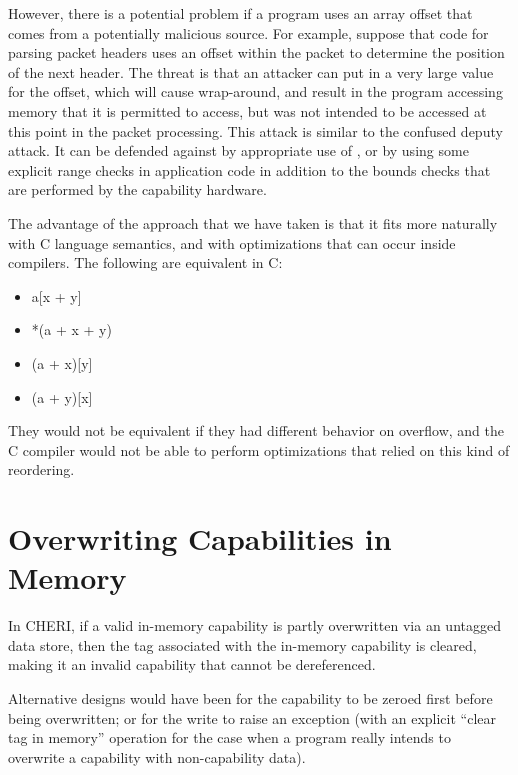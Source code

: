 However, there is a potential problem if a program uses an array offset that
comes from a potentially malicious source. For example, suppose that code for
parsing packet headers uses an offset within the packet to determine the
position of the next header. The threat is that an attacker can put in a
very large value for the offset, which will cause wrap-around, and result
in the program accessing memory that it is permitted to access, but was not
intended to be accessed at this point in the packet processing. This attack
is similar to the confused deputy attack. It can be defended against by
appropriate use of , or by using some explicit
range checks in application code in addition to the bounds checks that are
performed by the capability hardware.

The advantage of the approach that we have taken is that it fits more naturally
with C language semantics, and with optimizations that can occur inside compilers.
The following are equivalent in C:

\begin{itemize}
\item
a[x + y]
\item
*(a + x + y)
\item
(a + x)[y]
\item
(a + y)[x]
\end{itemize}

They would not be equivalent if they had different behavior on overflow, and
the C compiler would not be able to perform optimizations that relied on
this kind of reordering.

\section{Overwriting Capabilities in Memory}

In CHERI, if a valid in-memory capability is partly overwritten via an
untagged data store, then the tag associated with the in-memory capability
is cleared, making it an invalid capability that cannot be dereferenced.

Alternative designs would have been for the capability to be zeroed first
before being overwritten; or for the write to raise an exception (with
an explicit ``clear tag in memory'' operation for the case when a
program really intends to overwrite a capability with non-capability data).

